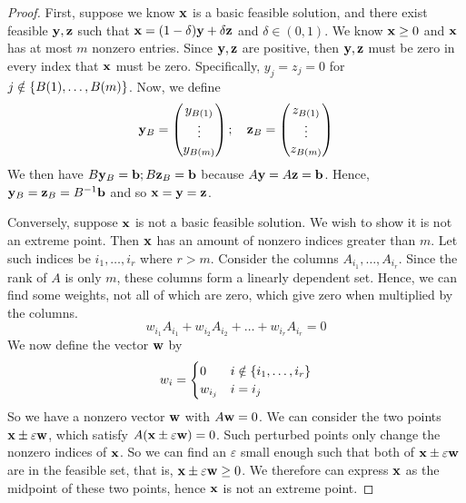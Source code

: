 \begin{proof}
	First, suppose we know \( \vb x \) is a basic feasible solution, and there exist feasible \( \vb y, \vb z \) such that \( \vb x = (1 - \delta) \vb y + \delta \vb z \) and \( \delta \in (0, 1) \).
	We know \( \vb x \geq 0 \) and \( \vb x \) has at most \( m \) nonzero entries.
	Since \( \vb y, \vb z \) are positive, then \( \vb y, \vb z \) must be zero in every index that \( \vb x \) must be zero.
	Specifically, \( y_j = z_j = 0 \) for \( j \notin \qty{ B(1), \dots, B(m) } \).
	Now, we define
	\[
		\vb y_B = \begin{pmatrix}
			y_{B(1)} \\ \vdots \\ y_{B(m)}
		\end{pmatrix};\quad \vb z_B = \begin{pmatrix}
			z_{B(1)} \\ \vdots \\ z_{B(m)}
		\end{pmatrix}
	\]
	We then have \( B \vb y_B = \vb b; B \vb z_B = \vb b \) because \( A\vb y = A\vb z = \vb b \).
	Hence, \( \vb y_B = \vb z_B = B^{-1} \vb b \) and so \( \vb x = \vb y = \vb z \).

	Conversely, suppose \( \vb x \) is not a basic feasible solution.
	We wish to show it is not an extreme point.
	Then \( \vb x \) has an amount of nonzero indices greater than \( m \).
	Let such indices be \( i_1, \dots, i_r \) where \( r > m \).
	Consider the columns \( A_{i_1}, \dots, A_{i_r} \).
	Since the rank of \( A \) is only \( m \), these columns form a linearly dependent set.
	Hence, we can find some weights, not all of which are zero, which give zero when multiplied by the columns.
	\[
		w_{i_1} A_{i_1} + w_{i_2} A_{i_2} + \dots + w_{i_r} A_{i_r} = 0
	\]
	We now define the vector \( \vb w \) by
	\[
		w_i = \begin{cases}
			0       & i \notin \qty{i_1, \dots, i_r} \\
			w_{i_j} & i = i_j
		\end{cases}
	\]
	So we have a nonzero vector \( \vb w \) with \( A \vb w = 0 \).
	We can consider the two points \( \vb x \pm \varepsilon \vb w \), which satisfy \( A(\vb x \pm \varepsilon \vb w) = 0 \).
	Such perturbed points only change the nonzero indices of \( \vb x \).
	So we can find an \( \varepsilon \) small enough such that both of \( \vb x \pm \varepsilon \vb w \) are in the feasible set, that is, \( \vb x \pm \varepsilon \vb w \geq 0 \).
	We therefore can express \( \vb x \) as the midpoint of these two points, hence \( \vb x \) is not an extreme point.
\end{proof}
